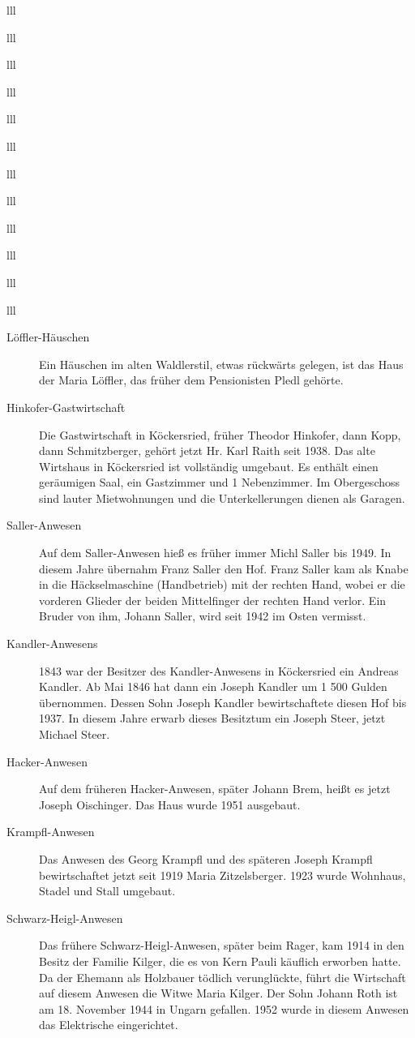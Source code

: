 \documentclass[12pt,a4pager]{book}
\begin{document}
\begin{tabuluar}{lll}
\begin{tabuluar}{lll}
\begin{tabuluar}{lll}
\begin{tabuluar}{lll}
\begin{tabuluar}{lll}
\begin{tabuluar}{lll}
\begin{tabuluar}{lll}
\begin{tabuluar}{lll}
\begin{tabuluar}{lll}
\begin{tabuluar}{lll}
\begin{tabuluar}{lll}
\begin{tabuluar}{lll}
\begin{description}
\item[Löffler-Häuschen] Ein Häuschen im alten Waldlerstil, etwas rückwärts
gelegen, ist das Haus der Maria Löffler, das früher dem Pensionisten Pledl
gehörte.

\item[Hinkofer-Gastwirtschaft] Die Gastwirtschaft in Köckersried, früher
Theodor Hinkofer, dann Kopp, dann Schmitzberger, gehört jetzt Hr. Karl Raith
seit 1938. Das alte Wirtshaus in Köckersried ist vollständig umgebaut. Es
enthält einen geräumigen Saal, ein Gastzimmer und 1 Nebenzimmer. Im Obergeschoss
sind lauter Mietwohnungen und die Unterkellerungen dienen als Garagen.

\item[Saller-Anwesen] Auf dem Saller-Anwesen hieß es früher immer Michl Saller
bis 1949. In diesem Jahre übernahm Franz Saller den Hof. Franz Saller kam als Knabe
in die Häckselmaschine (Handbetrieb) mit der rechten Hand, wobei er die vorderen
Glieder der beiden Mittelfinger der rechten Hand verlor. Ein Bruder von ihm,
Johann Saller, wird seit 1942 im Osten vermisst.

\item[Kandler-Anwesens] 1843 war der Besitzer des Kandler-Anwesens in
Köckersried ein Andreas Kandler. Ab Mai 1846 hat dann ein Joseph Kandler um 1
500 Gulden übernommen. Dessen Sohn Joseph Kandler bewirtschaftete diesen Hof bis
1937. In diesem Jahre erwarb dieses Besitztum ein Joseph Steer, jetzt Michael
Steer.

\item[Hacker-Anwesen] Auf dem früheren Hacker-Anwesen, später Johann Brem,
heißt es jetzt Joseph Oischinger. Das Haus wurde 1951 ausgebaut.

\item[Krampfl-Anwesen] Das Anwesen des Georg Krampfl und des späteren Joseph
Krampfl bewirtschaftet jetzt seit 1919 Maria Zitzelsberger. 1923 wurde Wohnhaus,
Stadel und Stall umgebaut.

\item[Schwarz-Heigl-Anwesen] Das frühere Schwarz-Heigl-Anwesen, später beim
Rager, kam 1914 in den Besitz der Familie Kilger, die es von Kern Pauli käuflich
erworben hatte. Da der Ehemann als Holzbauer tödlich verunglückte, führt die
Wirtschaft auf diesem Anwesen die Witwe Maria Kilger. Der Sohn Johann Roth ist
am 18. November 1944 in Ungarn gefallen. 1952 wurde in diesem Anwesen das
Elektrische eingerichtet.


\end{description}
\end{tabuluar}
\end{tabuluar}
\end{tabuluar}
\end{tabuluar}
\end{tabuluar}
\end{tabuluar}
\end{tabuluar}
\end{tabuluar}
\end{tabuluar}
\end{tabuluar}
\end{tabuluar}
\end{tabuluar}
\end{document}
